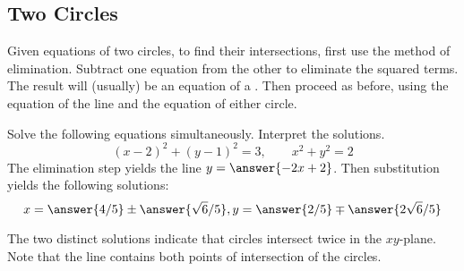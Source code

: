 \documentclass[space,handout,nooutcomes]{ximera}
\begin{document}
\subsection{Two Circles}
Given equations of two circles, to find their intersections, first use the method of elimination.  Subtract one equation from the other to eliminate the squared terms.  The result will (usually) be an equation of a .  Then proceed as before, using the equation of the line and the equation of either circle.  

\begin{problem}
Solve the following equations simultaneously.  Interpret the solutions.  
\[
(x-2)^2+(y-1)^2 = 3, \qquad x^2+y^2 = 2
\]
The elimination step yields the line $y = \answer{-2x+2}$.  Then substitution yields the following solutions:  
\[
x  = \answer{4/5} \pm \answer{\sqrt{6}/5}, y = \answer{2/5} \mp \answer{2\sqrt{6}/5}
\]
\begin{hint}
The two distinct solutions indicate that circles intersect twice in the $xy$-plane.  Note that the line contains both points of intersection of the circles.  
\end{hint}
\end{problem}


%


\end{document}
